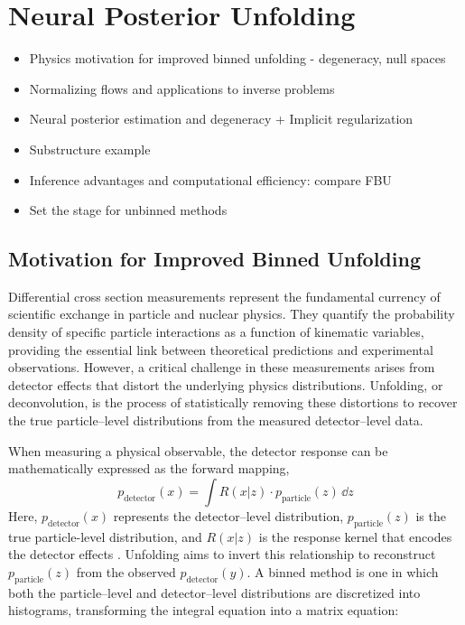 \chapter{Neural Posterior Unfolding}
\label{chap:npu}
\begin{itemize}
    \item Physics motivation for improved binned unfolding - degeneracy, null spaces
    \item Normalizing flows and applications to inverse problems
    \item Neural posterior estimation and degeneracy + Implicit regularization
    \item Substructure example
    \item Inference advantages and computational efficiency: compare FBU
    \item Set the stage for unbinned methods
\end{itemize}

\section{Motivation for Improved Binned Unfolding}
Differential cross section measurements represent the fundamental currency of scientific exchange in particle and nuclear physics.
%
They quantify the probability density of specific particle interactions as a function of kinematic variables, providing the essential link between theoretical predictions and experimental observations.
%
However, a critical challenge in these measurements arises from detector effects that distort the underlying physics distributions.
%
Unfolding, or deconvolution, is the process of statistically removing these distortions to recover the true particle--level distributions from the measured detector--level data.

When measuring a physical observable, the detector response can be mathematically expressed as the forward mapping,
\begin{equation}
    p_{\textrm{detector}}(x) = \int R(x|z) \cdot p_{\textrm{particle}}(z) \, \dd z
\end{equation}
Here, $p_{\textrm{detector}}(x)$ represents the detector--level distribution, $p_{\textrm{particle}}(z)$ is the true particle-level distribution, and $R(x|z)$ is the response kernel that encodes the detector effects .
%
Unfolding aims to invert this relationship to reconstruct \(p_{\textrm{particle}}(z)\) from the observed \(p_{\textrm{detector}}(y)\).
%
A binned method is one in which both the particle--level and detector--level distributions are discretized into histograms, transforming the integral equation into a matrix equation:

